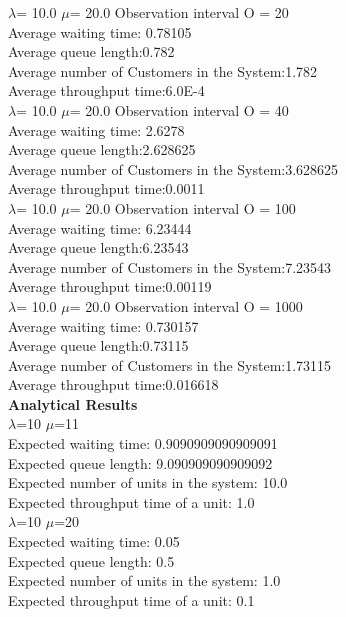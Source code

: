 \documentclass[a4paper,10pt]{report}
\begin{document}
\noindent$\lambda$= 10.0 $\mu$= 20.0 Observation interval O = 20\\
Average waiting time: 0.78105\\
Average queue length:0.782\\
Average number of Customers in the System:1.782\\
Average throughput time:6.0E-4\\

\noindent$\lambda$= 10.0 $\mu$= 20.0 Observation interval O = 40\\
Average waiting time: 2.6278\\
Average queue length:2.628625\\
Average number of Customers in the System:3.628625\\
Average throughput time:0.0011\\

\noindent$\lambda$= 10.0 $\mu$= 20.0 Observation interval O = 100\\
Average waiting time: 6.23444\\
Average queue length:6.23543\\
Average number of Customers in the System:7.23543\\
Average throughput time:0.00119\\

\noindent$\lambda$= 10.0 $\mu$= 20.0 Observation interval O = 1000\\
Average waiting time: 0.730157\\
Average queue length:0.73115\\
Average number of Customers in the System:1.73115\\
Average throughput time:0.016618\\

\noindent \textbf{Analytical Results}\\
$\lambda$=10 $\mu$=11\\
Expected waiting time: 0.9090909090909091\\
Expected queue length: 9.090909090909092\\
Expected number of units in the system: 10.0\\
Expected throughput time of a unit: 1.0\\

\noindent$\lambda$=10 $\mu$=20\\
Expected waiting time: 0.05\\
Expected queue length: 0.5\\
Expected number of units in the system: 1.0\\
Expected throughput time of a unit: 0.1\\
\end{document}
